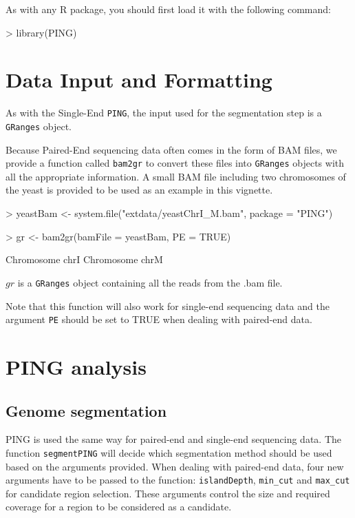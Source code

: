 \documentclass[11pt]{article}
\begin{document}
As with any R package, you should first load it with the following command:

\begin{Schunk}
\begin{Sinput}
> library(PING)
\end{Sinput}
\end{Schunk}

\section{Data Input and Formatting}
As with the Single-End \texttt{PING}, the input used for the segmentation step is a \texttt{GRanges} object.

Because Paired-End sequencing data often comes in the form of BAM files, we provide a function called \texttt{bam2gr} to convert these files into \texttt{GRanges} objects with all the appropriate information.
A small BAM file including two chromosomes of the yeast is provided to be used as an example in this vignette.

\begin{Schunk}
\begin{Sinput}
> yeastBam <- system.file("extdata/yeastChrI_M.bam", package = "PING")
\end{Sinput}
\end{Schunk}

\begin{Schunk}
\begin{Sinput}
> gr <- bam2gr(bamFile = yeastBam, PE = TRUE)
\end{Sinput}
\begin{Soutput}
Chromosome  chrI 
Chromosome  chrM 
\end{Soutput}
\end{Schunk}
$gr$ is a \texttt{GRanges} object containing all the reads from the .bam file. 

Note that this function will also work for single-end sequencing data and the argument \texttt{PE} should be set to TRUE when dealing with paired-end data.


\section{PING analysis}

\subsection{Genome segmentation}
PING is used the same way for paired-end and single-end sequencing data. The
function \texttt{segmentPING} will decide which segmentation method should be
used based on the arguments provided. 
When dealing with paired-end data, four new arguments have to be passed to the
function: \texttt{islandDepth}, \texttt{min_cut} 
and \texttt{max_cut} for candidate region selection. These arguments control the 
size and required coverage for a region to be considered as a candidate.
\end{document}
